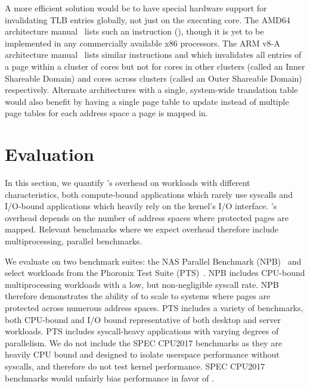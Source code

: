\documentclass[letterpaper,twocolumn,10pt, anonymous]{article}
\begin{document}
A more efficient solution would be to have special hardware support
for invalidating TLB entries globally, not just on the executing 
core. 
The AMD64 architecture manual~\cite{amd64prog} lists such an instruction 
(), though it is yet to be implemented in any commercially 
available x86 processors.
The ARM v8-A architecture manual~\cite{armv8a} lists similar instructions 
 and  which invalidates all entries 
of a page within a cluster of cores but not for cores in other clusters
(called an Inner Shareable Domain) and cores across clusters (called an 
Outer Shareable Domain) respectively.
Alternate architectures with a single, system-wide translation 
table~\cite{guptarebooting,ChaseLFL94} 
would also benefit \tiktok by having a single page table to 
update instead of multiple page tables for each address space a page
is mapped in.


\section{Evaluation}

In this section, we quantify \tiktok's overhead on workloads 
with different characteristics, both compute-bound applications
which rarely use syscalls and I/O-bound applications which 
heavily rely on the kernel's I/O interface.
\tiktok's overhead depends on the number of address spaces 
where protected pages are mapped. 
Relevant benchmarks where we expect overhead therefore include multiprocessing,
parallel benchmarks.

We evaluate \tiktok on two benchmark suites: the NAS Parallel 
Benchmark (NPB)~\cite{npb} and select workloads from the 
Phoronix Test Suite (PTS)~\cite{pts}. 
NPB includes CPU-bound multiprocessing workloads with a 
low, but non-negligible syscall rate. 
NPB therefore demonstrates the ability of \tiktok to 
scale to systems where pages are protected across numerous 
address spaces.
PTS includes a variety of benchmarks, both CPU-bound and 
I/O bound representative of both desktop and server workloads.
PTS includes syscall-heavy applications with varying degrees 
of parallelism.
We do not include the SPEC CPU2017 benchmarks
as they are heavily CPU bound and designed to isolate userspace 
performance without syscalls, and therefore do not test kernel 
performance. SPEC CPU2017 benchmarks would unfairly bias performance in favor of
\tiktok.
\end{document}
